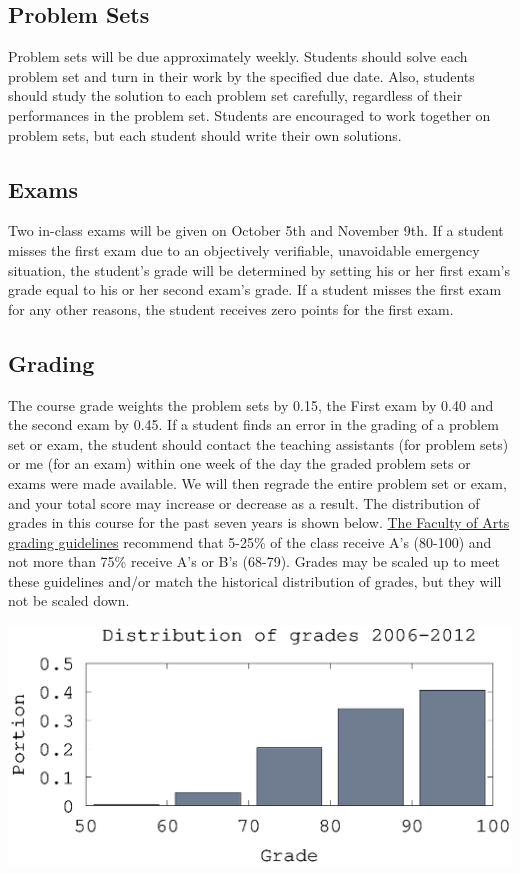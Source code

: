\documentclass[10pt]{article}
\begin{document}
\subsection{Problem Sets}
Problem sets will be due approximately weekly.  Students should solve
each problem set and turn in their work by the specified due
date. Also, students should study the solution to each problem set
carefully, regardless of their performances in the problem
set. Students are encouraged to work together on problem sets, but
each student should write their own solutions.

\subsection{Exams}
Two in-class exams will be given on October 5th and November 9th. If
a student misses the first exam due to an objectively verifiable,
unavoidable emergency situation, the student's grade will be
determined by setting his or her first exam's grade equal to his or her
second exam's grade. If a student misses the first exam for any other
reasons, the student receives zero points for the first exam.

\subsection{Grading}
The course grade weights the problem sets by 0.15, the First exam by
0.40 and the second exam by 0.45. If a student finds an error in the
grading of a problem set or exam, the student should contact the
teaching assistants (for problem sets) or me (for an exam) within one
week of the day the graded problem sets or exams were made
available. We will then regrade the entire problem set or exam, and
your total score may increase or decrease as a result.  The
distribution of grades in this course for the past seven years is shown
below.
\href{http://www.arts.ubc.ca/faculty-amp-staff/resources/courses-and-grading/grading-guidelines.html}
{The Faculty of Arts grading guidelines} recommend that 5-25\% of the
class receive A's (80-100) and not more than 75\% receive A's or B's
(68-79). Grades may be scaled up to meet these guidelines and/or match
the historical distribution of grades, but they will not be scaled
down. 

\begin{centering}
  \includegraphics[width=0.8\linewidth]{526gradeDist}
\end{centering}
\end{document}
